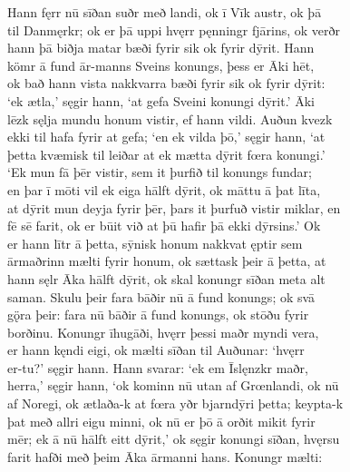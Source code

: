 \documentclass[12pt,letterpaper]{book}
\begin{document}
\begin{linenumbers}
Hann fęrr nū sīðan suðr með landi, ok ī Vīk austr, ok þā\\
til Danmęrkr; ok er þā uppi hvęrr pęnningr fjārins, ok verðr\\
hann þā biðja matar bæði fyrir sik ok fyrir dȳrit.  Hann\\
kömr ā fund ār-manns Sveins konungs, þess er Āki hēt,\\
ok bað hann vista nakkvarra bæði fyrir sik ok fyrir dȳrit:\\
`ek ætla,' sęgir hann, `at gefa Sveini konungi dȳrit.'  Āki\\
lēzk sęlja mundu honum vistir, ef hann vildi.  Auðun kvezk\\
ekki til hafa fyrir at gefa; `en ek vilda þō,' sęgir hann, `at\\
þetta kvæmisk til leiðar at ek mætta dȳrit fœra konungi.'\\
`Ek mun fā þēr vistir, sem it þurfið til konungs fundar;\\
en þar ī mōti vil ek eiga hālft dȳrit, ok māttu ā þat līta,\\
at dȳrit mun deyja fyrir þēr, þars it þurfuð vistir miklar, en\\
fē sē farit, ok er būit við at þū hafir þā ekki dȳrsins.'  Ok\\
er hann lītr ā þetta, sȳnisk honum nakkvat ęptir sem\\
ārmaðrinn mælti fyrir honum, ok sættask þeir ā þetta, at\\
hann sęlr Āka hālft dȳrit, ok skal konungr sīðan meta alt\\
saman.  Skulu þeir fara bāðir nū ā fund konungs; ok svā\\
gǫ̈ra þeir: fara nū bāðir ā fund konungs, ok stōðu fyrir\\
borðinu.  Konungr īhugāði, hvęrr þessi maðr myndi vera,\\
er hann kęndi eigi, ok mælti sīðan til Auðunar: `hvęrr\\
er-tu?' sęgir hann.  Hann svarar: `ek em Īslęnzkr maðr,\\
herra,' sęgir hann, `ok kominn nū utan af Grœnlandi, ok nū\\
af Noregi, ok ætlaða-k at fœra yðr bjarndȳri þetta; keypta-k\\
þat með allri eigu minni, ok nū er þō ā orðit mikit fyrir\\
mēr; ek ā nū hālft eitt dȳrit,' ok sęgir konungi sīðan, hvęrsu\\
farit hafði með þeim Āka ārmanni hans.  Konungr mælti:\\

\end{linenumbers}
\end{document}
